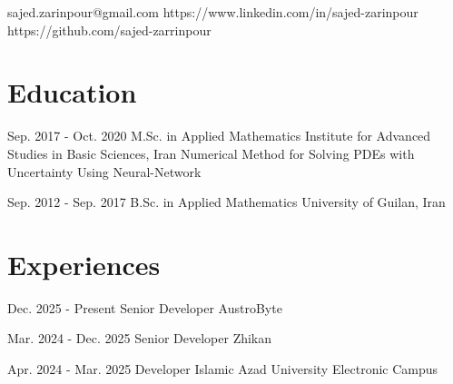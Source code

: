\documentclass[10pt, a4paper]{article}
\begin{document}
 
	\contactInfo
	{sajed.zarinpour@gmail.com}
	{https://www.linkedin.com/in/sajed-zarinpour}
	{https://github.com/sajed-zarrinpour}
	{}

	\slimseperator
	\section*{Education} 
		\eduEntry
		{{Sep. 2017 - Oct. 2020} \hspace{.5em}\normalsize}
		{M.Sc. in Applied Mathematics}
		{Institute for Advanced Studies in Basic Sciences, Iran}
		{Numerical Method for Solving PDEs with Uncertainty Using Neural-Network}
		{ 
		}
		
		\eduEntry
		{\small{Sep. 2012 - Sep. 2017}\hspace{.5cm}}
		{B.Sc. in Applied Mathematics}
		{University of Guilan, Iran}
		{} %
		{ 
		}
	
	\section*{Experiences}

		\expEntry
		{Dec. 2025 - Present \hspace{.5em}}
		{Senior Developer}
		{AustroByte}
		{}{}

		\expEntry
		{Mar. 2024 - Dec. 2025 \hspace{.5em}}
		{Senior Developer}
		{Zhikan}
		{}{}

		\expEntry
		{Apr. 2024 - Mar. 2025 \hspace{.5em}}
		{Developer}
		{Islamic Azad University Electronic Campus}
		{}{}
\end{document}

